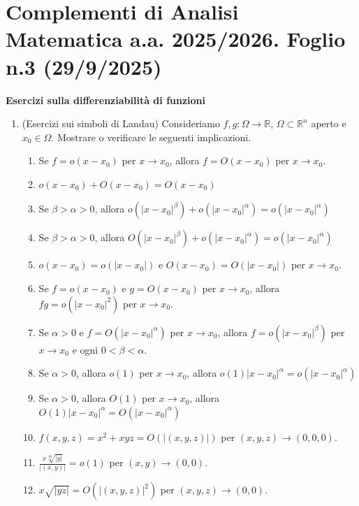 \section*{Complementi di Analisi Matematica a.a. 2025/2026. Foglio n.3 (29/9/2025)}

\textbf{Esercizi sulla differenziabilità di funzioni}

\begin{enumerate}
	\item (Esercizi sui simboli di Landau) Consideriamo $f, g: \Omega \to \mathbb{R}$, $\Omega \subset \mathbb{R}^n$ aperto e $x_0 \in \Omega$. Mostrare o verificare le seguenti implicazioni.
	\begin{enumerate}
		\item Se $f = o(x - x_0)$ per $x \to x_0$, allora $f = O(x - x_0)$ per $x \to x_0$.
		\item $o(x - x_0) + O(x - x_0) = O(x - x_0)$
		\item Se $\beta > \alpha > 0$, allora $o\left(|x - x_0|^\beta\right) + o\left(|x - x_0|^\alpha\right) = o\left(|x - x_0|^\alpha\right)$
		\item Se $\beta > \alpha > 0$, allora $O\left(|x - x_0|^\beta\right) + o\left(|x - x_0|^\alpha\right) = o\left(|x - x_0|^\alpha\right)$
		\item $o(x - x_0) = o\left(|x - x_0|\right)$ e $O(x - x_0) = O\left(|x - x_0|\right)$ per $x \to x_0$.
		\item Se $f = o(x - x_0)$ e $g = O(x - x_0)$ per $x \to x_0$, allora $f g = o\left(|x - x_0|^2\right)$ per $x \to x_0$.
		\item Se $\alpha > 0$ e $f = O\left(|x - x_0|^\alpha\right)$ per $x \to x_0$, allora $f = o\left(|x - x_0|^\beta\right)$ per $x \to x_0$ e ogni $0 < \beta < \alpha$.
		\item Se $\alpha > 0$, allora $o(1)$ per $x \to x_0$, allora $o(1) |x - x_0|^\alpha = o\left(|x - x_0|^\alpha\right)$
		\item Se $\alpha > 0$, allora $O(1)$ per $x \to x_0$, allora $O(1) |x - x_0|^\alpha = O\left(|x - x_0|^\alpha\right)$
		\item $f(x,y,z) = x^2 + x y z = O\left(|(x,y,z)|\right)$ per $(x,y,z) \to (0,0,0)$.
		\item $\frac{x \sqrt[10]{|y|}}{|(x,y)|} = o(1)$ per $(x,y) \to (0,0)$.
		\item $x \sqrt{|y z|} = O\left(|(x,y,z)|^2\right)$ per $(x,y,z) \to (0,0)$.
	\end{enumerate}
	

\end{enumerate}
